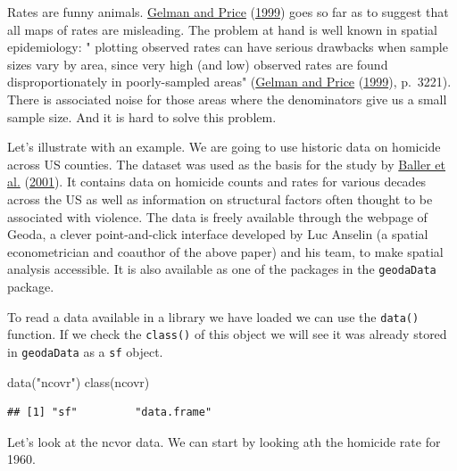 \documentclass[
  krantz2]{krantz}
\makeatletter
\newenvironment{Shaded}{\begin{snugshade}}{\end{snugshade}}
\newcommand{\FunctionTok}[1]{\textcolor[rgb]{0,0,0}{#1}}
\newcommand{\NormalTok}[1]{#1}
\newcommand{\SpecialCharTok}[1]{\textcolor[rgb]{0,0,0}{#1}}
\newcommand{\StringTok}[1]{\textcolor[rgb]{0.5,0.5,0.5}{#1}}
\newenvironment{kframe}{%
\medskip{}
\setlength{\fboxsep}{.8em}
 \def\at@end@of@kframe{}%
 \ifinner\ifhmode%
  \def\at@end@of@kframe{\end{minipage}}%
  \begin{minipage}{\columnwidth}%
 \fi\fi%
 \def\FrameCommand##1{\hskip\@totalleftmargin \hskip-\fboxsep
 \colorbox{shadecolor}{##1}\hskip-\fboxsep
     \hskip-\linewidth \hskip-\@totalleftmargin \hskip\columnwidth}%
 \MakeFramed {\advance\hsize-\width
   \@totalleftmargin\z@ \linewidth\hsize
   \@setminipage}}%
 {\par\unskip\endMakeFramed%
 \at@end@of@kframe}
\renewenvironment{Shaded}{\begin{kframe}}{\end{kframe}}
\makeatother
\begin{document}
Rates are funny animals. \protect\hyperlink{ref-Gelman_1999}{Gelman and Price} (\protect\hyperlink{ref-Gelman_1999}{1999}) goes so far as to suggest that all maps of rates are misleading. The problem at hand is well known in spatial epidemiology: " plotting observed rates can have serious drawbacks when sample sizes vary by area, since very high (and low) observed rates are found disproportionately in poorly-sampled areas" (\protect\hyperlink{ref-Gelman_1999}{Gelman and Price} (\protect\hyperlink{ref-Gelman_1999}{1999}), p.~3221). There is associated noise for those areas where the denominators give us a small sample size. And it is hard to solve this problem.

Let's illustrate with an example. We are going to use historic data on homicide across US counties. The dataset was used as the basis for the study by \protect\hyperlink{ref-Baller_2001}{Baller et al.} (\protect\hyperlink{ref-Baller_2001}{2001}). It contains data on homicide counts and rates for various decades across the US as well as information on structural factors often thought to be associated with violence. The data is freely available through the webpage of Geoda, a clever point-and-click interface developed by Luc Anselin (a spatial econometrician and coauthor of the above paper) and his team, to make spatial analysis accessible. It is also available as one of the packages in the \texttt{geodaData} package.

To read a data available in a library we have loaded we can use the \texttt{data()} function. If we check the \texttt{class()} of this object we will see it was already stored in \texttt{geodaData} as a \texttt{sf} object.

\begin{Shaded}
\begin{Highlighting}[]
\FunctionTok{data}\NormalTok{(}\StringTok{"ncovr"}\NormalTok{)}
\FunctionTok{class}\NormalTok{(ncovr)}
\end{Highlighting}
\end{Shaded}

\begin{verbatim}
## [1] "sf"         "data.frame"
\end{verbatim}

Let's look at the ncvor data. We can start by looking ath the homicide rate for 1960.

\begin{Shaded}
\end{Shaded}
\end{document}
